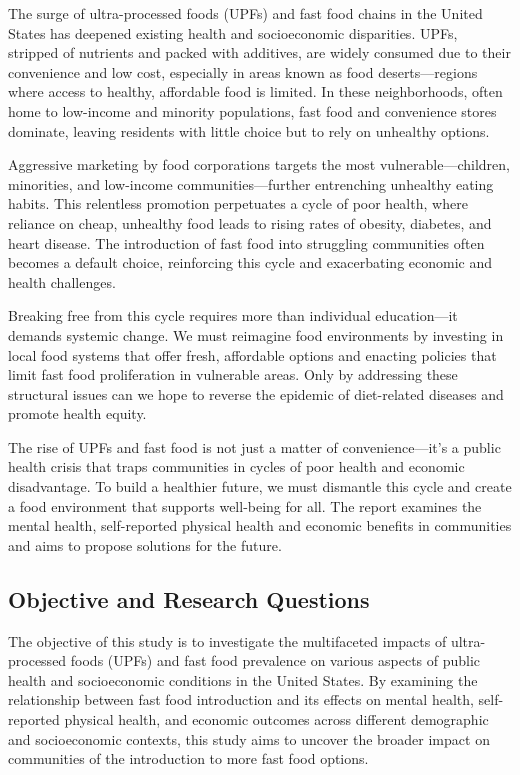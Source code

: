 \documentclass[letterpaper, 11pt]{report}
\begin{document}
The surge of ultra-processed foods (UPFs) and fast food chains in the United States has deepened existing health and socioeconomic disparities. UPFs, stripped of nutrients and packed with additives, are widely consumed due to their convenience and low cost, especially in areas known as food deserts—regions where access to healthy, affordable food is limited. In these neighborhoods, often home to low-income and minority populations, fast food and convenience stores dominate, leaving residents with little choice but to rely on unhealthy options.

Aggressive marketing by food corporations targets the most vulnerable—children, minorities, and low-income communities—further entrenching unhealthy eating habits. This relentless promotion perpetuates a cycle of poor health, where reliance on cheap, unhealthy food leads to rising rates of obesity, diabetes, and heart disease. The introduction of fast food into struggling communities often becomes a default choice, reinforcing this cycle and exacerbating economic and health challenges.

Breaking free from this cycle requires more than individual education—it demands systemic change. We must reimagine food environments by investing in local food systems that offer fresh, affordable options and enacting policies that limit fast food proliferation in vulnerable areas. Only by addressing these structural issues can we hope to reverse the epidemic of diet-related diseases and promote health equity.

The rise of UPFs and fast food is not just a matter of convenience—it's a public health crisis that traps communities in cycles of poor health and economic disadvantage. To build a healthier future, we must dismantle this cycle and create a food environment that supports well-being for all. The report examines the mental health, self-reported physical health and economic benefits in communities and aims to propose solutions for the future.



\subsection{Objective and Research Questions}

The objective of this study is to investigate the multifaceted impacts of ultra-processed foods (UPFs) and fast food prevalence on various aspects of public health and socioeconomic conditions in the United States. By examining the relationship between fast food introduction and its effects on mental health, self-reported physical health, and economic outcomes across different demographic and socioeconomic contexts, this study aims to uncover the broader impact on communities of the introduction to more fast food options.
\end{document}
